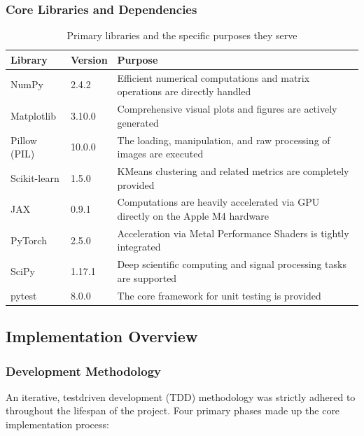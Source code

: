 \subsubsection{Core Libraries and Dependencies}

\begin{table}[H]
\centering
\caption{Primary libraries and the specific purposes they serve}
\label{tab:libraries}
\begin{tabularx}{\textwidth}{|l|l|X|}
\hline
\textbf{Library} & \textbf{Version} & \textbf{Purpose} \\
\hline
NumPy & 2.4.2 & Efficient numerical computations and matrix operations are directly handled \\
\hline
Matplotlib & 3.10.0 & Comprehensive visual plots and figures are actively generated \\
\hline
Pillow (PIL) & 10.0.0 & The loading, manipulation, and raw processing of images are executed \\
\hline
Scikit-learn & 1.5.0 & KMeans clustering and related metrics are completely provided \\
\hline
JAX & 0.9.1 & Computations are heavily accelerated via GPU directly on the Apple M4 hardware \\
\hline
PyTorch & 2.5.0 & Acceleration via Metal Performance Shaders is tightly integrated \\
\hline
SciPy & 1.17.1 & Deep scientific computing and signal processing tasks are supported \\
\hline
pytest & 8.0.0 & The core framework for unit testing is provided \\
\hline
\end{tabularx}
\end{table}


\subsection{Implementation Overview}

\subsubsection{Development Methodology}

An iterative, testdriven development (TDD) methodology was strictly adhered to throughout the lifespan of the project. Four primary phases made up the core implementation process:


